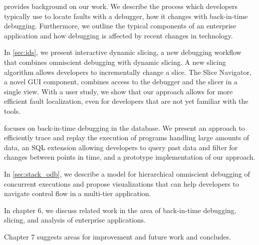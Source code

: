  provides background on our work.
We describe the process which developers typically use to locate faults with a debugger, how it changes with back-in-time debugging.
Furthermore, we outline the typical components of an enterprise application and how debugging is affected by recent changes in technology.

In \cref{sec:ids}, we present interactive dynamic slicing, a new debugging workflow that combines omniscient debugging with dynamic slicing.
A new slicing algorithm allows developers to incrementally change a slice. 
The Slice Navigator, a novel GUI component, combines access to the debugger and the slicer in a single view.
With a user study, we show that our approach allows for more efficient fault localization, even for developers that are not yet familiar with the tools.

 focuses on back-in-time debugging in the database.
We present an approach to efficiently trace and replay the execution of programs handling large amounts of data,
an SQL extension allowing developers to query past data and filter for changes between points in time,
and a prototype implementation of our approach.

In \cref{sec:stack_odb}, we describe a model for hierarchical omniscient debugging of concurrent executions and propose visualizations that can help developers to navigate control flow in a multi-tier application.

In chapter 6, we discuss related work in the area of back-in-time debugging, slicing, and analysis of enterprise applications.

Chapter 7 suggests areas for improvement and future work and concludes.


%
%



